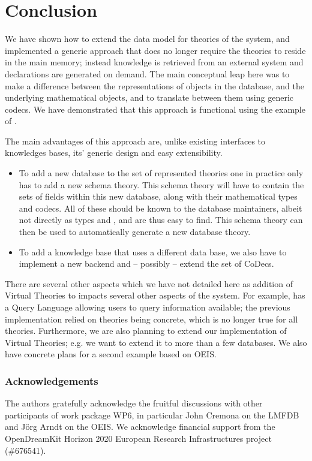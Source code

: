 \section{Conclusion}\label{sec:concl}

We have shown how to extend the data model for theories of the \mmt system, and implemented a generic approach that does no longer require the theories to reside in the main memory; instead knowledge is retrieved from an external system and declarations are generated on demand.
The main conceptual leap here was to make a difference between the representations of objects in the database, and the underlying mathematical objects, and to translate between them using generic codecs. 
We have demonstrated that this approach is functional using the example of \lmfdb. 

The main advantages of this approach are, unlike existing interfaces to knowledges bases, its' generic design and easy extensibility. 
\begin{itemize}
\item To add a new \lmfdb database to the set of represented theories one in practice only
  has to add a new schema theory.  This schema theory will have to contain the sets of
  fields within this new database, along with their mathematical types and codecs.  All of
  these should be known to the database maintainers, albeit not directly as types and
  , and are thus easy to find.  This schema theory can then be used to
  automatically generate a new database theory.
\item To add a knowledge base that uses a different data base, we also have to implement a
  new \mmt backend and -- possibly -- extend the set of CoDecs.
\end{itemize}

There are several other aspects which we have not detailed here as addition of Virtual Theories to \mmt impacts several other aspects of the system. 
For example, \mmt has a Query Language allowing users to query information available; the previous implementation relied on theories being concrete, which is no longer true for all theories.  
Furthermore, we are also planning to extend our implementation of Virtual Theories; e.g. we want to extend it to more than a few \lmfdb databases. 
We also have concrete plans for a second example based on OEIS. 

\subsubsection*{Acknowledgements}
The authors gratefully acknowledge the fruitful discussions with other participants of
work package WP6, in particular John Cremona on the LMFDB and J\"org Arndt on the OEIS. We
acknowledge financial support from the OpenDreamKit Horizon 2020 European Research
Infrastructures project (\#676541).



